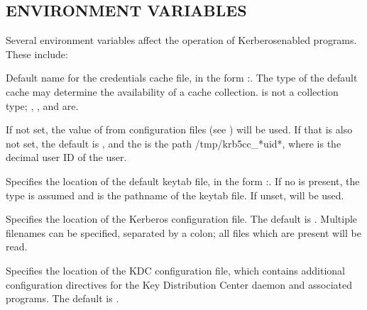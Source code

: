 \documentclass[letterpaper,10pt,english]{sphinxmanual}
\begin{document}
\subsection{ENVIRONMENT VARIABLES}
\label{\detokenize{user/user_config/kerberos:environment-variables}}
\sphinxAtStartPar
Several environment variables affect the operation of Kerberos\sphinxhyphen{}enabled
programs.  These include:
\begin{description}
\sphinxAtStartPar
Default name for the credentials cache file, in the form
:.  The type of the default cache may determine
the availability of a cache collection.   is not a
collection type; , , and  are.

\sphinxAtStartPar
If not set, the value of  from
configuration files (see ) will be used.  If that
is also not set, the default  is , and the
 is the path /tmp/krb5cc\_*uid*, where  is the
decimal user ID of the user.

\sphinxAtStartPar
Specifies the location of the default keytab file, in the form
:.  If no  is present, the  type is
assumed and  is the pathname of the keytab file.  If
unset,  will be used.

\sphinxAtStartPar
Specifies the location of the Kerberos configuration file.  The
default is .  Multiple filenames can
be specified, separated by a colon; all files which are present
will be read.

\sphinxAtStartPar
Specifies the location of the KDC configuration file, which
contains additional configuration directives for the Key
Distribution Center daemon and associated programs.  The default
is .


\end{description}
\end{document}

